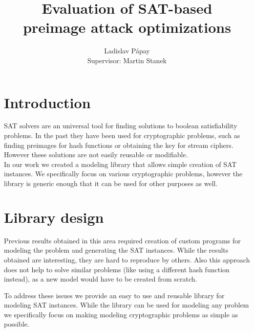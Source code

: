 \documentclass[myposter,portrait]{sciposter}
\def\mysection#1{
{\color{sectionCol}\section*{\sc\bfseries #1}}}
\begin{document}
\setlength{\logowidth}{20cm}
\setlength{\titlewidth}{\textwidth}
\addtolength{\titlewidth}{-\logowidth}
\useleftlogofalse

\color{textCol}

\title{Evaluation of SAT-based\\ preimage attack optimizations}
\author{Ladislav P\'apay\\
        Supervisor: Martin Stanek}
\maketitle

\begin{multicols*}{3}

\mysection{Introduction}
SAT solvers are an universal tool for finding solutions to boolean satisfiability problems.
In the past they have been used for cryptographic problems, such as finding preimages for hash functions or obtaining the key for stream ciphers.
However these solutions are not easily reusable or modifiable.
~\\

In our work we created a modeling library that allows simple creation of SAT instances.
We specifically focus on various cryptographic problems, however the library is generic enough that it can be used for other purposes as well.
~\\


\mysection{Library design}
Previous results obtained in this area required creation of custom programs for modeling the problem and generating the SAT instances.
While the results obtained are interesting, they are hard to reproduce by others.
Also this approach does not help to solve similar problems (like using a different hash function instead), as a new model would have to be created from scratch.

To address these issues we provide an easy to use and reusable library for modeling SAT instances.
While the library can be used for modeling any problem we specifically focus on making modeling cryptographic problems as simple as possible.
~\\


\end{multicols*}
\end{document}
